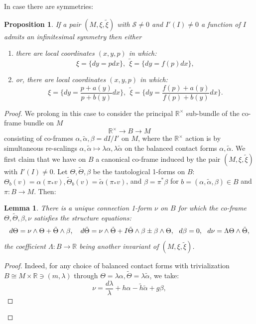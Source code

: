 \documentclass[10pt]{amsart}
\newcommand{\R}{\mathbb{R}}
\newtheorem{lem}[thm]{Lemma}
\newtheorem{prop}[thm]{Proposition}
\theoremstyle{definition}
\begin{document}
In case there are symmetries:
\begin{prop}\label{prop:SymmsDepGen}
    If a pair $(M, \xi, \tilde \xi)$ with $\mathcal{S}\ne 0$ and $I'(I)\ne 0$ a function of $I$ admits an infinitesimal symmetry then either
    \begin{enumerate}
        \item there are local coordinates $(x,y,p)$ in which:
        \[ \xi = \{ dy = p dx\}, ~~\tilde \xi = \{ dy = f(p) dx\}, \]
        \item or, there are local coordinates $(x,y,p)$ in which:
    \[ \xi = \{  dy = \frac{p + a(y)}{p + b(y)} dx \} , ~~\tilde \xi = \{ dy = \frac{f(p) + a(y)}{f(p) + b(y)} dx \}. \]
    \end{enumerate}
\end{prop}
\begin{proof}
    We prolong in this case to consider the principal $\R^\times$ sub-bundle of the co-frame bundle on $M$
    \[ \R^\times \to B\to M \]
    consisting of co-frames $\alpha, \tilde\alpha, \beta = dI/I'$ on $M$, where the $\R^\times$ action is by simultaneous re-scalings $\alpha,\tilde\alpha \mapsto \lambda\alpha, \lambda\tilde\alpha$ on the balanced contact forms $\alpha, \tilde\alpha$. We first claim that we have on $B$ a canonical co-frame induced by the pair $(M,\xi, \tilde \xi)$ with $I'(I)\ne 0$. Let $\Theta, \tilde\Theta, \beta$ be the tautological 1-forms on $B$: $\Theta_b(v) = \alpha(\pi_*v), \tilde\Theta_b(v) = \tilde\alpha(\pi_*v)$, and $\beta = \pi^*\beta$ for $b = (\alpha, \tilde\alpha, \beta)\in B$ and $\pi:B\to M$. Then:
    \begin{lem}
         There is a unique connection 1-form $\nu$ on $B$ for which the co-frame $\Theta, \tilde\Theta, \beta, \nu$ satisfies the structure equations:
    \begin{equation}\label{eq:liftStrEq}
        d\Theta = \nu\wedge\Theta + \tilde\Theta\wedge \beta, ~~~d\tilde\Theta = \nu\wedge\Tilde\Theta + I\tilde\Theta\wedge\beta \pm \beta\wedge\Theta , ~~d\beta = 0, ~~d\nu = \Lambda \Theta\wedge\tilde\Theta,
    \end{equation}
    the coefficient $\Lambda:B\to \R$ being another invariant of $(M,\xi, \tilde \xi)$.
    \end{lem}
    \begin{proof}
        Indeed, for any choice of balanced contact forms with trivialization $B\cong M\times\R\ni (m, \lambda)$ through $\Theta = \lambda\alpha, \tilde\Theta = \lambda \tilde\alpha$, we take:
    \[ \nu = \frac{d\lambda}{\lambda} + h \alpha - \tilde h \tilde\alpha + g\beta,   \]

\end{proof}
\end{proof}
\end{document}
